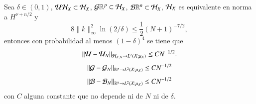 
\begin{teo}
    Sea $\delta \in (0, 1)$, $\mathcal{U} \mathcal{H}_X \subset \mathcal{H}_X$, $\mathcal{G} \mathbb{R}^p \subset \mathcal{H}_X$, $\mathcal{B} \mathbb{R}^n \subset \mathcal{H}_X$, $\mathcal{H}_{\mathcal{X}}$ es equivalente en norma a $H^{\nu + n/2}$ y 
    \[
    8\|k\|^2_\infty \ln(2/\delta) \leq \frac{1}{2} (N+1)^{-7/2},
    \]
    entonces con probabilidad al menos $(1-\delta)^4$ se tiene que
     \begin{equation*}
        \| \mathcal{U} - \mathcal{U}_N \|_{\mathcal{H}_{\mathcal{X}, N} \to L^2(\mathcal{X}; \mu_{\mathcal{X}})} \leq C N^{-1/2}.
    \end{equation*}
    \begin{equation*}
    \| \mathcal{G} - \mathcal{G}_N \|_{\mathbb{R}^p \to L^2(\mathcal{X}; \mu_{\mathcal{X}})} \leq C N^{-1/2}
    \end{equation*}
    \begin{equation*}
    \| \mathcal{B} - \mathcal{B}_N \|_{\mathbb{R}^n \to L^2(\mathcal{X}; \mu_{\mathcal{X}})} \leq C N^{-1/2}
    \end{equation*}
    con $C$ alguna constante que no depende ni de $N$ ni de $\delta$.
    \label{teo:error_koop_sqrt_N_def}
\end{teo}

